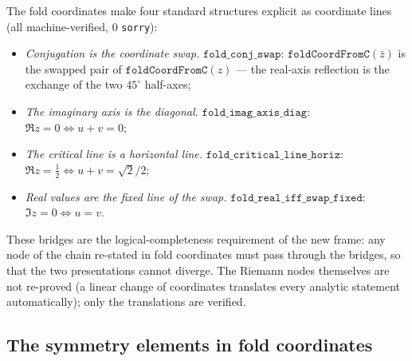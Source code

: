 \documentclass{article}
\begin{document}
The fold coordinates make four standard structures explicit as
coordinate lines (all machine-verified, 0 \texttt{sorry}):
\begin{itemize}
\item \emph{Conjugation is the coordinate swap.}
  $\texttt{fold\_conj\_swap}$: $\texttt{foldCoordFromC}(\bar z)$ is the
  swapped pair of $\texttt{foldCoordFromC}(z)$ --- the real-axis
  reflection is the exchange of the two $45^\circ$ half-axes;
\item \emph{The imaginary axis is the diagonal.}
  $\texttt{fold\_imag\_axis\_diag}$: $\Re z=0\iff u+v=0$;
\item \emph{The critical line is a horizontal line.}
  $\texttt{fold\_critical\_line\_horiz}$:
  $\Re z=\tfrac12\iff u+v=\sqrt2/2$;
\item \emph{Real values are the fixed line of the swap.}
  $\texttt{fold\_real\_iff\_swap\_fixed}$: $\Im z=0\iff u=v$.
\end{itemize}
These bridges are the logical-completeness requirement of the new
frame: any node of the chain re-stated in fold coordinates must pass
through the bridges, so that the two presentations cannot diverge. The
Riemann nodes themselves are not re-proved (a linear change of
coordinates translates every analytic statement automatically); only
the translations are verified.


\subsection{The symmetry elements in fold coordinates}
\label{sec:partIV:sym}
\end{document}
